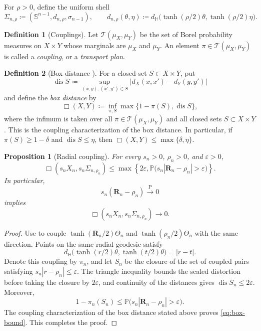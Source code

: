 \documentclass{amsart}
\numberwithin{equation}{section}
\theoremstyle{plain}
\newtheorem{prop}[thm]{Proposition}
\theoremstyle{definition}
\newtheorem*{unnumbereddefn}{Definition}
\theoremstyle{remark}
\newcommand{\Hyp}{\mathbb{H}}
\newcommand{\Sph}{\mathbb{S}}
\newcommand{\eps}{\varepsilon}
\begin{document}
For $\rho>0$, define the uniform shell
\begin{equation}\label{eq:shell}
	\Sigma_{n,\rho}
	\coloneqq
	(\Sph^{n-1},d_{n,\rho},\sigma_{n-1}),
	\qquad
	d_{n,\rho}(\theta,\eta)
	\coloneqq
	d_{\Hyp}\bigl(\tanh(\rho/2)\theta,\tanh(\rho/2)\eta\bigr).
\end{equation}

\begin{unnumbereddefn}[Couplings]
Let $\mathcal T(\mu_X,\mu_Y)$ be the set of Borel probability measures on
$X\times Y$ whose marginals are $\mu_X$ and $\mu_Y$. An element
$\pi\in\mathcal T(\mu_X,\mu_Y)$ is called a \emph{coupling}, or a
\emph{transport plan}.
\end{unnumbereddefn}

\begin{unnumbereddefn}[Box distance {\cite[Proposition~4.4 and Theorem~1.1]{nakajima2022coupling}}]
For a closed set $S\subset X\times Y$, put
\[ \operatorname{dis}S\coloneqq \sup_{(x,y),(x',y')\in S} \left|d_X(x,x')-d_Y(y,y')\right| \]
and define the \emph{box distance} by
\[ \Box(X,Y)\coloneqq \inf_{\pi,S}\max\{1-\pi(S),\operatorname{dis}S\}, \]
where the infimum is taken over all $\pi\in\mathcal T(\mu_X,\mu_Y)$ and all
closed sets $S\subset X\times Y$. This is the coupling characterization of the
box distance. In particular, if
$\pi(S)\ge1-\delta$ and $\operatorname{dis}S\le\eta$, then
$\Box(X,Y)\le\max\{\delta,\eta\}$.
\end{unnumbereddefn}

\begin{prop}[Radial coupling]\label{prop:radial-coupling}
	For every $s_n>0$, $\rho_n>0$, and $\eps>0$,
	\begin{equation}\label{eq:box-bound}
		\Box(s_nX_n,s_n\Sigma_{n,\rho_n})
		\le
		\max\left\{2\eps,
		\mathbb P\bigl(s_n|\mathbf R_n-\rho_n|>\eps\bigr)\right\}.
	\end{equation}
	In particular,
	\begin{equation}\label{eq:scaled-shell-dirac}
		s_n(\mathbf R_n-\rho_n)\overset{\mathrm P}{\longrightarrow}0
	\end{equation}
	implies
	\[
		\Box(s_nX_n,s_n\Sigma_{n,\rho_n})\longrightarrow0.
	\]
\end{prop}

\begin{proof}
	Use  to couple
	$\tanh(\mathbf R_n/2)\Theta_n$ and $\tanh(\rho_n/2)\Theta_n$ with the same
	direction.  Points on the same radial geodesic satisfy
	\[
		d_{\Hyp}\bigl(\tanh(r/2)\theta,\tanh(t/2)\theta\bigr)=|r-t|.
	\]
	Denote this coupling by $\pi_n$, and let $S_n$ be the closure of the set
	of coupled pairs satisfying $s_n|r-\rho_n|\le\eps$. The triangle
	inequality bounds the scaled distortion before taking the closure by
	$2\eps$, and continuity of the distances gives
	$\operatorname{dis}S_n\le2\eps$. Moreover,
\[ 1-\pi_n(S_n) \le\mathbb P\bigl(s_n|\mathbf R_n-\rho_n|>\eps\bigr). \]
	The coupling characterization of the box distance stated above proves
	\eqref{eq:box-bound}. This completes the proof.
\end{proof}
\end{document}
